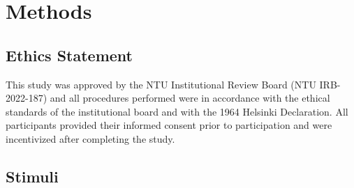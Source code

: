 \documentclass[
  man,floatsintext]{apa6}
\begin{document}
\hypertarget{methods}{%
\section{Methods}\label{methods}}

\hypertarget{ethics-statement}{%
\subsection{Ethics Statement}\label{ethics-statement}}

This study was approved by the NTU Institutional Review Board (NTU IRB-2022-187) and all procedures performed were in accordance with the ethical standards of the institutional board and with the 1964 Helsinki Declaration. All participants provided their informed consent prior to participation and were incentivized after completing the study.

\hypertarget{stimuli}{%
\subsection{Stimuli}\label{stimuli}}
\end{document}
